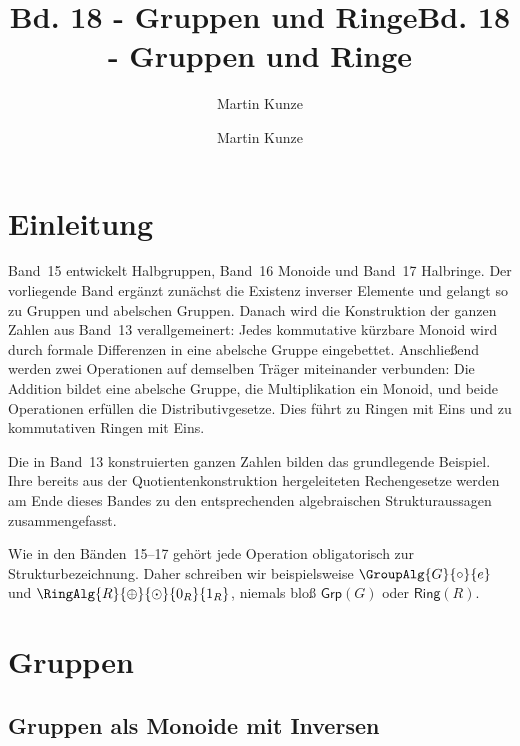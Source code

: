 \documentclass[main.tex]{subfiles}
\title{Bd. 18 - Gruppen und Ringe}
\author{Martin Kunze}
\date{}
\begin{document}
\title{Bd. 18 - Gruppen und Ringe}
\author{Martin Kunze}
\date{}
\hypersetup{pageanchor=false}
\maketitle
\hypersetup{pageanchor=true}
\setcounter{tocdepth}{3}
\tableofcontents
\setcounter{file}{18}
\renewcommand{\FormulaBandID}{18}

\chapter{Einleitung}

Band~15 entwickelt Halbgruppen, Band~16 Monoide und Band~17 Halbringe.
Der vorliegende Band ergänzt zunächst die Existenz inverser Elemente und
gelangt so zu Gruppen und abelschen Gruppen. Danach wird die Konstruktion
der ganzen Zahlen aus Band~13 verallgemeinert: Jedes kommutative kürzbare
Monoid wird durch formale Differenzen in eine abelsche Gruppe eingebettet.
Anschließend werden zwei Operationen auf demselben Träger miteinander
verbunden: Die Addition bildet eine abelsche Gruppe, die Multiplikation ein
Monoid, und beide Operationen erfüllen die Distributivgesetze. Dies führt zu
Ringen mit Eins und zu kommutativen Ringen mit Eins.

Die in Band~13 konstruierten ganzen Zahlen bilden das grundlegende Beispiel.
Ihre bereits aus der Quotientenkonstruktion hergeleiteten Rechengesetze
werden am Ende dieses Bandes zu den entsprechenden algebraischen
Strukturaussagen zusammengefasst.

Wie in den Bänden~15--17 gehört jede Operation obligatorisch zur
Strukturbezeichnung. Daher schreiben wir beispielsweise
\(\GroupAlg{G}{\circ}{e}\) und
\(\RingAlg{R}{\oplus}{\odot}{0_R}{1_R}\), niemals bloß
\(\mathsf{Grp}(G)\) oder \(\mathsf{Ring}(R)\).

\chapter{Gruppen}

\section{Gruppen als Monoide mit Inversen}

\end{document}
